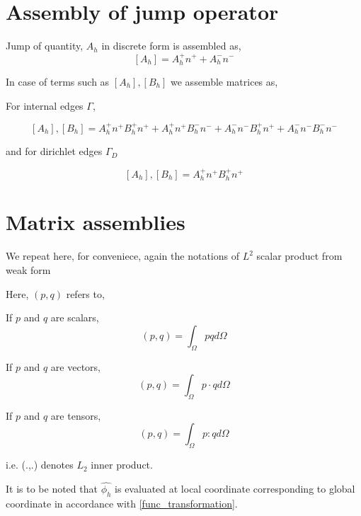 \documentclass[a4paper,12pt]{book}
\begin{document}
\section{Assembly of jump operator} \label{Jump operator}

Jump of quantity, $A_h$ in discrete form is assembled as,
\begin{equation} \label{Jump_operator}
[A_h] = A_h^+ n^+ + A_h^- n^-
\end{equation}

In case of terms such as $[A_h],[B_h]$ we assemble matrices as, 

For internal edges $\Gamma$,

\begin{equation} \label{Jump operator L2}
[A_h],[B_h] = A_h^+ n^+ B_h^+ n^+ + A_h^+ n^+ B_h^- n^- + A_h^- n^- B_h^+ n^+ + A_h^- n^- B_h^- n^-
\end{equation}

and for dirichlet edges $\Gamma_D$

\begin{equation} \label{Jump operator L2 for dirichlet}
[A_h],[B_h] = A_h^+ n^+ B_h^+ n^+ 
\end{equation}


\section{Matrix assemblies}

We repeat here, for conveniece, again the notations of $L^2$ scalar product from weak form

Here, $(p,q)$ refers to,

If $p$ and $q$ are scalars,
\begin{equation}\label{inner product scalars}
(p,q)=\int_{\Omega} pq d \Omega 
\end{equation}

If $p$ and $q$ are vectors,
\begin{equation}\label{Inner product vectors}
(p,q)=\int_{\Omega} p \cdot q d\Omega
\end{equation}

If $p$ and $q$ are tensors,
\begin{equation}\label{Inner product tensors}
(p,q)=\int_{\Omega} p:q d\Omega
\end{equation}

i.e. (.,.) denotes $L_2$ inner product.

It is to be noted that $\hat{\phi_h}$ is evaluated at local coordinate corresponding to global coordinate in accordance with \ref{func_transformation}.
\end{document}
